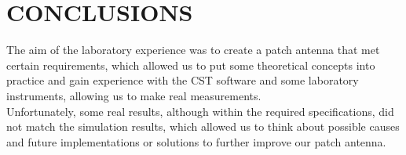 \documentclass[]{article}
\begin{document}
\section{CONCLUSIONS}
The aim of the laboratory experience was to create a patch antenna that met certain requirements, which allowed us to put some theoretical concepts into practice and gain experience with the CST software and some laboratory instruments, allowing us to make real measurements.\\ Unfortunately, some real results, although within the required specifications, did not match the simulation results, which allowed us to think about possible causes and future implementations or solutions to further improve our patch antenna.
\end{document}
